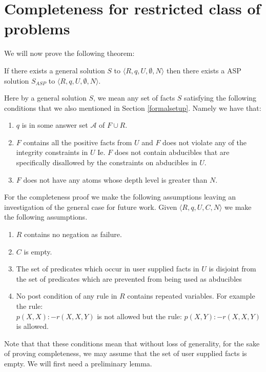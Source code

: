 \section{Completeness for restricted class of problems}\label{sec:completeness}
We will now prove the following theorem:
\begin{theorem}[Completeness]\label{thm:completeness}
  If there exists a general solution $S$ to $\langle R,q,U,\emptyset,N\rangle$ then there
  exists a ASP solution $S_{ASP}$ to $\langle R,q,U,\emptyset,N\rangle$.
\end{theorem}
Here by a general solution $S$, we mean any set of facts $S$ satisfying the following conditions that we also mentioned in Section \ref{formalsetup}. Namely we have that: \begin{enumerate}
    \item $q$ is in some answer set $\mathcal{A}$ of $F\cup R$.
    \item $F$ contains all the positive facts from $U$ and $F$ does not violate any of the integrity constraints in $U$ Ie. $F$ does not contain abducibles that are specifically disallowed by the constraints on abducibles in $U$.
    \item $F$ does not have any atoms whose depth level is greater than $N$.
\end{enumerate}

For the completeness proof we make the following assumptions leaving an
investigation of the general case for future work. Given $\langle
R,q,U,C,N\rangle$ we make the following assumptions. 

\begin{enumerate}
\item $R$ contains no negation as failure.
\item $C$ is empty.
\item The set of predicates which occur in user supplied facts in $U$ is
  disjoint from the set of predicates which are prevented from being used as
  abducibles
\item No post condition of any rule in $R$ contains repeated variables. For example the rule:\\
$p(X,X):-r(X,X,Y)$ is not allowed but the rule: $p(X,Y):-r(X,X,Y)$ is allowed.
\end{enumerate}

Note that that these conditions mean that without loss of generality, for the sake of proving completeness, we may assume that the set of user supplied facts is empty. We will first need a preliminary lemma.

